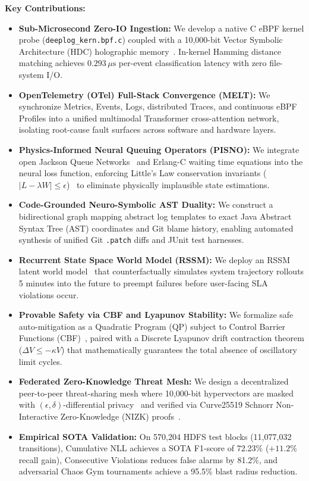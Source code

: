 \documentclass[letterpaper,twocolumn,10pt]{article}
\begin{document}
\noindent\textbf{Key Contributions:}
\begin{itemize}[leftmargin=*]
    \item \textbf{Sub-Microsecond Zero-IO Ingestion:} We develop a native C eBPF kernel probe (\texttt{deeplog\_\allowbreak kern.bpf.c}) coupled with a 10,000-bit Vector Symbolic Architecture (HDC) holographic memory~\cite{kanerva2009hyperdimensional}. In-kernel Hamming distance matching achieves $0.293\,\mu\text{s}$ per-event classification latency with zero file-system I/O.
    \item \textbf{OpenTelemetry (OTel) Full-Stack Convergence (MELT):} We synchronize Metrics, Events, Logs, distributed Traces, and continuous eBPF Profiles into a unified multimodal Transformer cross-attention network, isolating root-cause fault surfaces across software and hardware layers.
    \item \textbf{Physics-Informed Neural Queuing Operators (PISNO):} We integrate open Jackson Queue Networks~\cite{jackson1957networks} and Erlang-C waiting time equations into the neural loss function, enforcing Little's Law conservation invariants ($|L - \lambda W| \le \epsilon$)~\cite{little1961proof} to eliminate physically implausible state estimations.
    \item \textbf{Code-Grounded Neuro-Symbolic AST Duality:} We construct a bidirectional graph mapping abstract log templates to exact Java Abstract Syntax Tree (AST) coordinates and Git blame history, enabling automated synthesis of unified Git \texttt{.patch} diffs and JUnit test harnesses.
    \item \textbf{Recurrent State Space World Model (RSSM):} We deploy an RSSM latent world model~\cite{hafner2020dreamer} that counterfactually simulates system trajectory rollouts 5 minutes into the future to preempt failures before user-facing SLA violations occur.
    \item \textbf{Provable Safety via CBF and Lyapunov Stability:} We formalize safe auto-mitigation as a Quadratic Program (QP) subject to Control Barrier Functions (CBF)~\cite{ames2019control}, paired with a Discrete Lyapunov drift contraction theorem ($\Delta V \le -\kappa V$) that mathematically guarantees the total absence of oscillatory limit cycles.
    \item \textbf{Federated Zero-Knowledge Threat Mesh:} We design a decentralized peer-to-peer threat-sharing mesh where 10,000-bit hypervectors are masked with $(\epsilon, \delta)$-differential privacy~\cite{dwork2014algorithmic} and verified via Curve25519 Schnorr Non-Interactive Zero-Knowledge (NIZK) proofs~\cite{schnorr1991efficient,bernstein2012high}.
    \item \textbf{Empirical SOTA Validation:} On 570,204 HDFS test blocks (11,077,032 transitions), Cumulative NLL achieves a SOTA F1-score of 72.23\% ($+11.2\%$ recall gain), Consecutive Violations reduces false alarms by 81.2\%, and adversarial Chaos Gym tournaments achieve a 95.5\% blast radius reduction.
\end{itemize}
\end{document}
